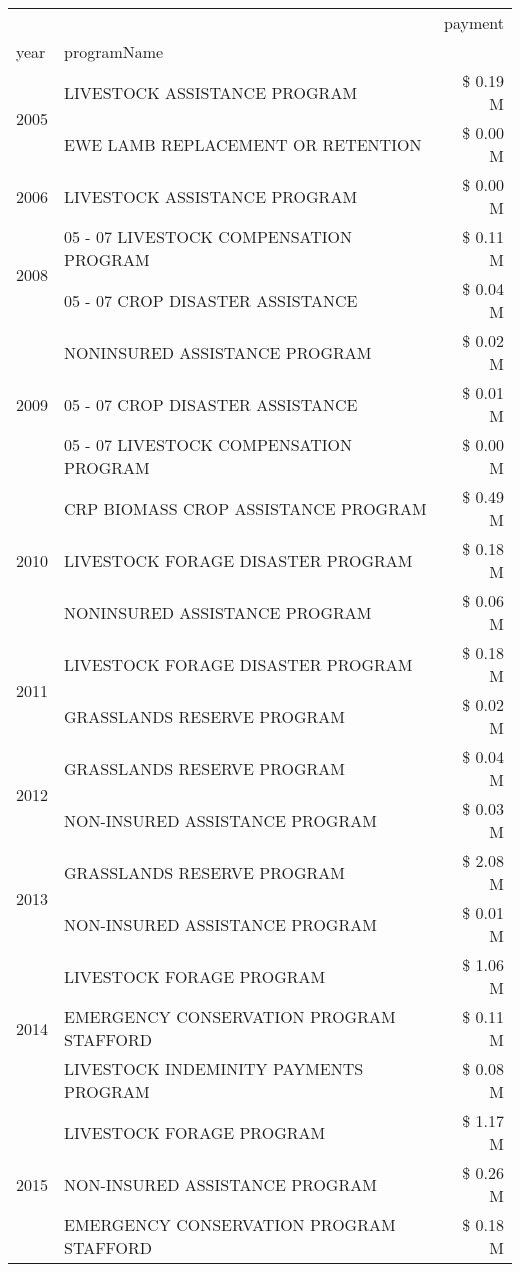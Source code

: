 \begin{tabular}{llr}
\toprule
 &  & payment \\
year & programName &  \\
\midrule
\multirow[t]{2}{*}{2005} & LIVESTOCK ASSISTANCE PROGRAM & \$ 0.19 M \\
 & EWE LAMB REPLACEMENT OR RETENTION & \$ 0.00 M \\
\cline{1-3}
2006 & LIVESTOCK ASSISTANCE PROGRAM & \$ 0.00 M \\
\cline{1-3}
\multirow[t]{2}{*}{2008} & 05 - 07 LIVESTOCK COMPENSATION PROGRAM & \$ 0.11 M \\
 & 05 - 07 CROP DISASTER ASSISTANCE & \$ 0.04 M \\
\cline{1-3}
\multirow[t]{3}{*}{2009} & NONINSURED ASSISTANCE PROGRAM & \$ 0.02 M \\
 & 05 - 07 CROP DISASTER ASSISTANCE & \$ 0.01 M \\
 & 05 - 07 LIVESTOCK COMPENSATION PROGRAM & \$ 0.00 M \\
\cline{1-3}
\multirow[t]{3}{*}{2010} & CRP BIOMASS CROP ASSISTANCE PROGRAM & \$ 0.49 M \\
 & LIVESTOCK FORAGE DISASTER PROGRAM & \$ 0.18 M \\
 & NONINSURED ASSISTANCE PROGRAM & \$ 0.06 M \\
\cline{1-3}
\multirow[t]{2}{*}{2011} & LIVESTOCK FORAGE DISASTER PROGRAM & \$ 0.18 M \\
 & GRASSLANDS RESERVE PROGRAM & \$ 0.02 M \\
\cline{1-3}
\multirow[t]{2}{*}{2012} & GRASSLANDS RESERVE PROGRAM & \$ 0.04 M \\
 & NON-INSURED ASSISTANCE PROGRAM & \$ 0.03 M \\
\cline{1-3}
\multirow[t]{2}{*}{2013} & GRASSLANDS RESERVE PROGRAM & \$ 2.08 M \\
 & NON-INSURED ASSISTANCE PROGRAM & \$ 0.01 M \\
\cline{1-3}
\multirow[t]{3}{*}{2014} & LIVESTOCK FORAGE PROGRAM & \$ 1.06 M \\
 & EMERGENCY CONSERVATION PROGRAM STAFFORD & \$ 0.11 M \\
 & LIVESTOCK INDEMINITY PAYMENTS PROGRAM & \$ 0.08 M \\
\cline{1-3}
\multirow[t]{3}{*}{2015} & LIVESTOCK FORAGE PROGRAM & \$ 1.17 M \\
 & NON-INSURED ASSISTANCE PROGRAM & \$ 0.26 M \\
 & EMERGENCY CONSERVATION PROGRAM STAFFORD & \$ 0.18 M \\

\end{tabular}
